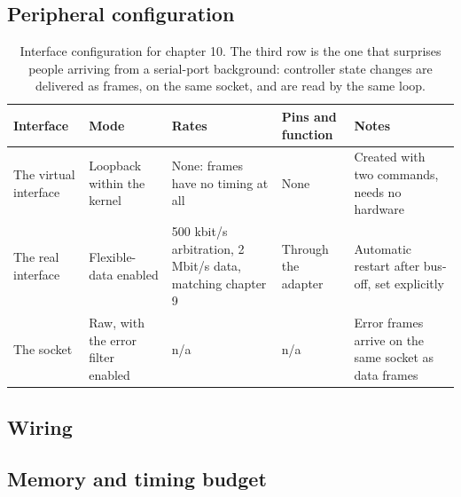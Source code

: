 \subsection*{Peripheral configuration}

\begin{table}[H]\centering\small
\begin{tabular}{p{22mm}p{26mm}p{24mm}p{30mm}p{30mm}}
\toprule
Interface & Mode & Rates & Pins and function & Notes \\
\midrule
The virtual interface & Loopback within the kernel & None: frames have no timing at all & None & Created with two commands, needs no hardware \\
The real interface & Flexible-data enabled & 500 kbit/s arbitration, 2 Mbit/s data, matching chapter 9 & Through the adapter & Automatic restart after bus-off, set explicitly \\
The socket & Raw, with the error filter enabled & n/a & n/a & Error frames arrive on the same socket as data frames \\
\bottomrule
\end{tabular}
\caption{Interface configuration for chapter 10. The third row is the one that surprises people arriving from a serial-port background: controller state changes are delivered as frames, on the same socket, and are read by the same loop.}
\end{table}

\subsection*{Wiring}


\subsection*{Memory and timing budget}


